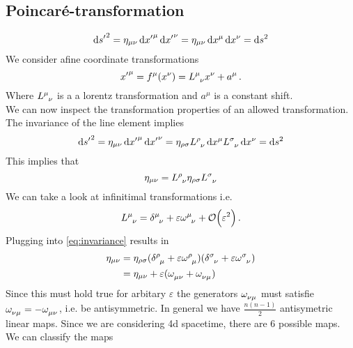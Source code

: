 \subsection{Poincaré-transformation}
\begin{equation}
\dif {s^\prime}^2 = \eta_{\mu\nu}\dif {x^\prime}^\mu\dif
{x^\prime}^\nu=\eta_{\mu\nu}\dif x^\mu\dif
x^\nu = \dif s^2
\end{equation}
We consider afine coordinate transformations 
\begin{equation}
{x^\prime}^\mu= f^\mu(x^\nu)=\tensor{L}{^\mu_\nu}x^\nu+a^\mu\, .
\end{equation}
Where $\tensor{L}{^\mu_\nu}$ is a a lorentz transformation and $a^\mu$ is a
constant shift.\\
We can now inspect the transformation properties of an allowed transformation.
The invariance of the line element implies
\begin{equation}
\dif {s^\prime}^2 = \eta_{\mu\nu}\dif {x^\prime}^\mu\dif
{x^\prime}^\nu=\eta_{\rho\sigma}\tensor{L}{^\rho_\nu}\dif
x^\mu\tensor{L}{^\sigma_\nu}\dif x^\nu = \dif s^2
\end{equation}
This implies that
\begin{equation}
\eta_{\mu\nu}=\tensor{L}{^\rho_\nu}\eta_{\rho\sigma}\tensor{L}{^\sigma_\nu}\label{eq:invariance}
\end{equation}
We can take a look at infinitimal transformations i.e.
\begin{equation}
\tensor{L}{^\mu_\nu}=\tensor{\delta}{^\mu_\nu}
+\varepsilon\tensor{\omega}{^\mu_\nu}+\mathcal{O}\left(\varepsilon^2\right)\, .
\end{equation}
Plugging into \eqref{eq:invariance} results in
\begin{equation}
\begin{split}
\eta_{\mu\nu}&=\eta_{\rho\sigma}(\tensor{\delta}{^\rho_\mu}
+\varepsilon\tensor{\omega}{^\rho_\mu})(\tensor{\delta}{^\sigma_\nu}
+\varepsilon\tensor{\omega}{^\sigma_\nu})\\
&=
\eta_{\mu\nu}+\varepsilon(\tensor{\omega}{_\mu_\nu}+\tensor{\omega}{_\nu_\mu})
\end{split}
\end{equation}
Since this must hold true for arbitary $\varepsilon$ the generators
$\tensor{\omega}{_\nu_\mu}$ must satisfie
$\tensor{\omega}{_\nu_\mu}=-\tensor{\omega}{_\mu_\nu}$, i.e. be antisymmetric.
In general we have $\frac{n(n-1)}{2}$ antisymetric linear maps. Since we are
considering 4d spacetime, there are $6$ possible maps. We can classify the maps
